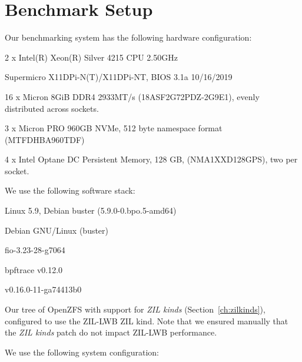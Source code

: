 \documentclass[12pt,a4paper,twoside]{book}
\begin{document}
\section{Benchmark Setup}\label{ch:lwb_analysis:setup}
Our benchmarking system has the following hardware configuration:
\begin{description}[noitemsep,leftmargin=1.5cm,labelindent=1cm]
    \item[CPU] 2 x Intel(R) Xeon(R) Silver 4215 CPU \@ 2.50GHz
    \item[Mainboard] Supermicro X11DPi-N(T)/X11DPi-NT, BIOS 3.1a 10/16/2019
    \item[DRAM] 16 x Micron 8GiB DDR4 2933MT/s (18ASF2G72PDZ-2G9E1), evenly distributed across sockets.
    \item[NVMe] 3 x Micron PRO 960GB NVMe, 512 byte namespace format (MTFDHBA960TDF)
    \item[PMEM] 4 x Intel Optane DC Persistent Memory, 128 GB, (NMA1XXD128GPS), two per socket.
\end{description}
We use the following software stack:
\begin{description}[noitemsep,leftmargin=1.5cm,labelindent=1cm]
    \item[Kernel] Linux 5.9, Debian buster (5.9.0-0.bpo.5-amd64)
    \item[Userland] Debian GNU/Linux (buster)
    \item[fio] fio-3.23-28-g7064
    \item[bpftrace] bpftrace v0.12.0
    \item[bcc] v0.16.0-11-ga74413b0
    \item[OpenZFS] Our tree of OpenZFS with support for \textit{ZIL kinds} (Section~\ref{ch:zilkinds}), configured to use the ZIL-LWB ZIL kind.
        Note that we ensured manually that the \textit{ZIL kinds} patch do not impact ZIL-LWB performance.
\end{description}
We use the following system configuration:
\end{document}
